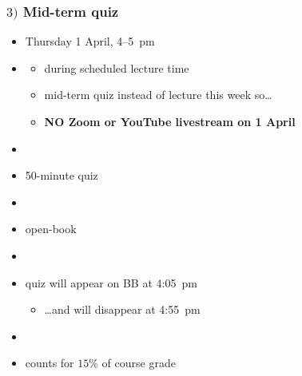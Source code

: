 \documentclass[english,14pt]{beamer}
\begin{document}

\begin{frame}[fragile]

\frametitle{$3)$ Mid-term quiz}

\begin{itemize}
	\item Thursday 1 April, 4--5~pm
	\item[]
	\begin{itemize}
		\item during scheduled lecture time
		\item mid-term quiz instead of lecture this week so\ldots
		\item \textbf{NO Zoom or YouTube livestream on 1 April}
	\end{itemize}
	\item[]
	\item 50-minute quiz
	\item[]
	\item open-book
	\item[]
	\item quiz will appear on BB at 4:05~pm
	\begin{itemize}
		\item[] \ldots and will disappear at 4:55~pm
	\end{itemize}
	\item[]
	\item counts for $15$\% of course grade

\end{itemize}

\end{frame}

\end{document}
